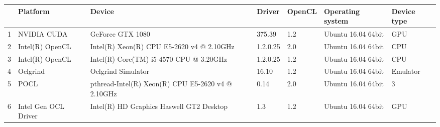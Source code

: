 \begin{tabular}{lllllll}
\toprule
{} &              Platform &                                             Device &    Driver & OpenCL &    Operating system & Device type \\
\midrule
1 &           NVIDIA CUDA &                                   GeForce GTX 1080 &    375.39 &    1.2 &  Ubuntu 16.04 64bit &         GPU \\
2 &       Intel(R) OpenCL &          Intel(R) Xeon(R) CPU E5-2620 v4 @ 2.10GHz &  1.2.0.25 &    2.0 &  Ubuntu 16.04 64bit &         CPU \\
3 &       Intel(R) OpenCL &            Intel(R) Core(TM) i5-4570 CPU @ 3.20GHz &  1.2.0.25 &    1.2 &  Ubuntu 16.04 64bit &         CPU \\
4 &              Oclgrind &                                 Oclgrind Simulator &     16.10 &    1.2 &  Ubuntu 16.04 64bit &    Emulator \\
5 &                  POCL &  pthread-Intel(R) Xeon(R) CPU E5-2620 v4 @ 2.10GHz &      0.14 &    2.0 &  Ubuntu 16.04 64bit &           3 \\
6 &  Intel Gen OCL Driver &           Intel(R) HD Graphics Haswell GT2 Desktop &       1.3 &    1.2 &  Ubuntu 16.04 64bit &         GPU \\
\bottomrule
\end{tabular}
